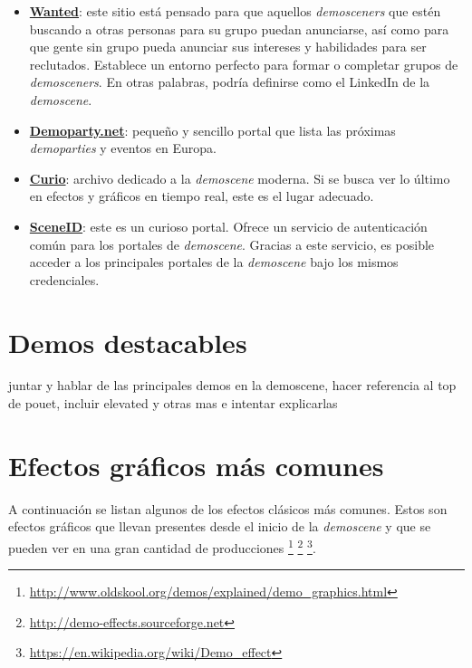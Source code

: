 \begin{itemize}
	\item \textbf{\href{http://wanted.scene.org}{Wanted}}: este sitio está pensado para que aquellos \emph{demosceners} que estén buscando a otras personas para su grupo puedan anunciarse, así como para que gente sin grupo pueda anunciar sus intereses y habilidades para ser reclutados. Establece un entorno perfecto para formar o completar grupos de \emph{demosceners}. En otras palabras, podría definirse como el LinkedIn de la \emph{demoscene}.
	\item \textbf{\href{https://www.demoparty.net}{Demoparty.net}}: pequeño y sencillo portal que lista las próximas \emph{demoparties} y eventos en Europa.
	\item \textbf{\href{http://curio.scene.org}{Curio}}: archivo dedicado a la \emph{demoscene} moderna. Si se busca ver lo último en efectos y gráficos en tiempo real, este es el lugar adecuado.
	\item \textbf{\href{https://id.scene.org}{SceneID}}: este es un curioso portal. Ofrece un servicio de autenticación común para los portales de \emph{demoscene}. Gracias a este servicio, es posible acceder a los principales portales de la \emph{demoscene} bajo los mismos credenciales.
\end{itemize}

\section{Demos destacables}
juntar y hablar de las principales demos en la demoscene, hacer referencia al top de pouet, incluir elevated y otras mas e intentar explicarlas

\section{Efectos gráficos más comunes}

A continuación se listan algunos de los efectos clásicos más comunes. Estos son efectos gráficos que llevan presentes desde el inicio de la \emph{demoscene} y que se pueden ver en una gran cantidad de producciones \footnote{\url{http://www.oldskool.org/demos/explained/demo_graphics.html}} \footnote{\url{http://demo-effects.sourceforge.net}} \footnote{\url{https://en.wikipedia.org/wiki/Demo_effect}}.


